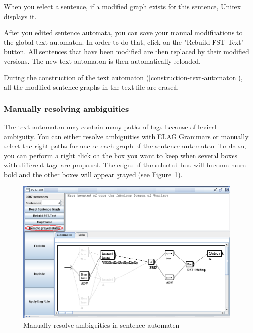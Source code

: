 \bigskip
\noindent When you select a sentence, if a modified graph exists for this sentence, Unitex
displays it. 

\bigskip
\noindent After you edited sentence automata, you can save your
manual modifications to the global text automaton. In order to do that, click on the "Rebuild
FST-Text" button. All sentences that have been modified are then replaced by their modified versions.
The new text automaton is then automatically reloaded.

\bigskip
\noindent During the construction of the text automaton (\ref{construction-text-automaton}), all the modified
sentence graphs in the text file are erased.

\subsubsection{Manually resolving ambiguities}
The text automaton may contain many paths of tags because of lexical ambiguity. You can either resolve ambiguities with ELAG Grammars or manually select the right paths for one or each graph of the sentence automaton.
To do so, you can perform a right click on the box you want to keep when several boxes with different tags are proposed. The edges of the selected box will become more bold and the other boxes will appear grayed (see Figure~\ref{fig-manually-resolve-ambiguities}).

\begin{figure}[!ht]
\begin{center}
\includegraphics[width=15cm]{resources/img/fig7-24b.png}
\caption{Manually resolve ambiguities in sentence automaton\label{fig-manually-resolve-ambiguities}}
\end{center}
\end{figure} 

